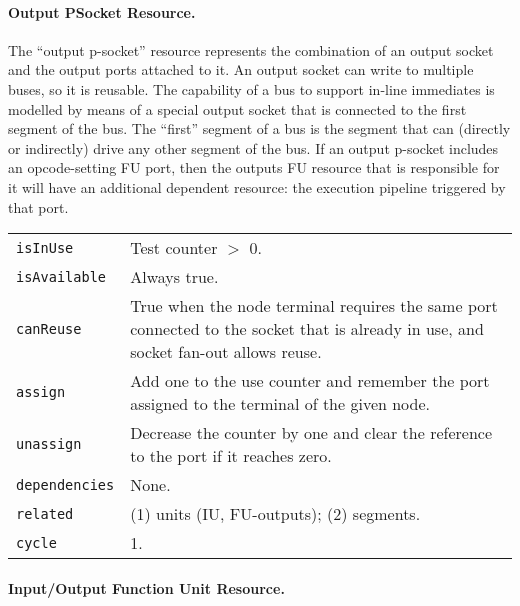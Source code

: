 \documentclass[a4paper,twoside]{tce}
\begin{document}
\paragraph{Output PSocket Resource.}

The ``output p-socket'' resource represents the combination of an output
socket and the output ports attached to it. An output socket can write to
multiple buses, so it is reusable. The capability of a bus to support
in-line immediates is modelled by means of a special output socket that is
connected to the first segment of the bus. The ``first'' segment of a bus is
the segment that can (directly or indirectly) drive any other segment of the
bus.
%
If an output p-socket includes an opcode-setting FU port, then the outputs
FU resource that is responsible for it will have an additional dependent
resource: the execution pipeline triggered by that port.

\begin{flushleft}
\begin{tabular*}{\textwidth}[h]{|l|@{\extracolsep{\fill}}p{}|}
  \hline
  \texttt{isInUse} &
  Test counter $>$ 0.\\
  \texttt{isAvailable} &
  Always true.\footnotemark\\
  \texttt{canReuse} &
  True when the node terminal requires the same port connected to the socket
  that is already in use, and socket fan-out allows reuse.\\
  \texttt{assign} &
  Add one to the use counter and remember the port assigned to the terminal
  of the given node.\\
  \texttt{unassign} &
  Decrease the counter by one and clear the reference to the port if it
  reaches zero.\\
  \texttt{dependencies} &
  None.\\
  \texttt{related} &
  (1) units (IU, FU-outputs); (2) segments.\\
  \texttt{cycle} &
  1.\\
  \hline
\end{tabular*}
\end{flushleft}

\paragraph{Input/Output Function Unit Resource.}
\end{document}
